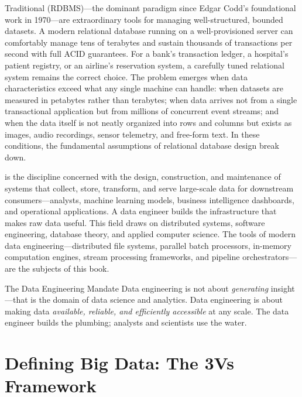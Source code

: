 Traditional  (RDBMS)---the
dominant paradigm since Edgar Codd's foundational work in 1970---are
extraordinary tools for managing well-structured, bounded datasets. A
modern relational database running on a well-provisioned server can
comfortably manage tens of terabytes and sustain thousands of
transactions per second with full ACID guarantees. For a bank's
transaction ledger, a hospital's patient registry, or an airline's
reservation system, a carefully tuned relational system remains the
correct choice. The problem emerges when data characteristics exceed
what any single machine can handle: when datasets are measured in
petabytes rather than terabytes; when data arrives not from a single
transactional application but from millions of concurrent event streams;
and when the data itself is not neatly organized into rows and columns
but exists as images, audio recordings, sensor telemetry, and free-form
text. In these conditions, the fundamental assumptions of relational
database design break down.

 is the discipline concerned with the design,
construction, and maintenance of systems that collect, store, transform,
and serve large-scale data for downstream consumers---analysts, machine
learning models, business intelligence dashboards, and operational
applications. A data engineer builds the infrastructure that makes raw
data useful. This field draws on distributed systems, software
engineering, database theory, and applied computer science. The tools of
modern data engineering---distributed file systems, parallel batch
processors, in-memory computation engines, stream processing frameworks,
and pipeline orchestrators---are the subjects of this book.

\begin{keyinsight}{The Data Engineering Mandate}
Data engineering is not about \emph{generating} insight---that is the
domain of data science and analytics. Data engineering is about making
data \emph{available, reliable, and efficiently accessible} at any
scale. The data engineer builds the plumbing; analysts and scientists
use the water.
\end{keyinsight}

\section{Defining Big Data: The 3Vs Framework}
\label{sec:three-vs}

